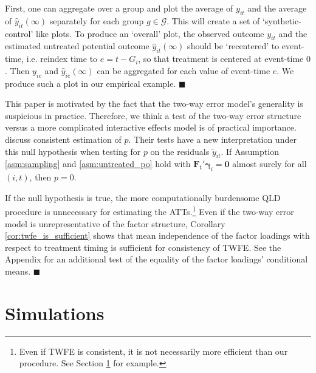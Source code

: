 \documentclass[12pt]{article}
\begin{document}
\begin{remark}
First, one can aggregate over a group and plot the average of $y_{it}$ and the average of $\hat{y}_{it}(\infty)$ separately for each group $g \in \mathcal{G}$. This will create a set of `synthetic-control' like plots. To produce an `overall' plot, the observed outcome $y_{it}$ and the estimated untreated potential outcome $\hat{y}_{it}(\infty)$ should be `recentered' to event-time, i.e. reindex time to $e = t - G_i$, so that treatment is centered at event-time $0$. Then $y_{ie}$ and $\hat{y}_{ie}(\infty)$ can be aggregated for each value of event-time $e$. We produce such a plot in our empirical example. $\blacksquare$

\end{remark}

\begin{remark}\label{remark:twfe_testing}
  This paper is motivated by the fact that the two-way error model's generality is suspicious in practice. Therefore, we think a test of the two-way error structure versus a more complicated interactive effects model is of practical importance. \citet{Ahn_Lee_Schmidt_2013} discuss consistent estimation of $p$. Their tests have a new interpretation under this null hypothesis when testing for $p$ on the residuals $\tilde{y}_{it}$. If Assumption \ref{asm:sampling} and \ref{asm:untreated_po} hold with $\bm{F}_t' \bm \gamma_i = \bm 0$ almost surely for all $(i,t)$, then $p = 0$.

  If the null hypothesis is true, the more computationally burdensome QLD procedure is unnecessary for estimating the ATTs.\footnote{Even if TWFE is consistent, it is not necessarily more efficient than our procedure. See Section \ref{sec:simulations} for example.} Even if the two-way error model is unrepresentative of the factor structure, Corollary \ref{cor:twfe_is_sufficient} shows that mean independence of the factor loadings with respect to treatment timing is sufficient for consistency of TWFE. See the Appendix for an additional test of the equality of the factor loadings' conditional means. $\blacksquare$
\end{remark}


\section{Simulations}\label{sec:simulations}
\end{document}
